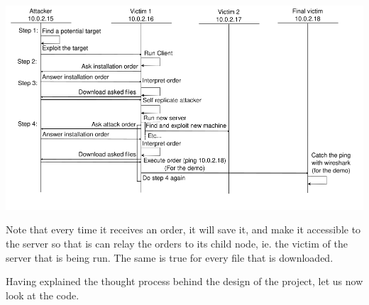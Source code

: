\documentclass[../main.tex]{subfiles}
\begin{document}
    \includegraphics[width=450pt]{botnet_flow.png}

    Note that every time it receives an order, it will save it, and make it accessible to the server so that is can relay the orders to its child node, ie. the victim of the server that is being run.
    The same is true for every file that is downloaded.

    Having explained the thought process behind the design of the project, let us now look at the code.
\end{document}
